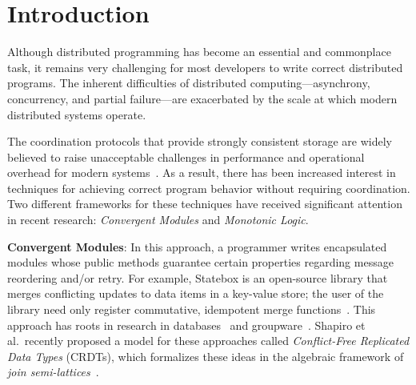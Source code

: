 \section{Introduction} 
\label{sec:intro} 
Although distributed programming has become an essential and commonplace task,
it remains very challenging for most developers to write correct distributed
programs. The inherent difficulties of distributed computing---asynchrony,
concurrency, and partial failure---are exacerbated by the scale at which modern
distributed systems operate.


The coordination protocols that provide strongly consistent storage are widely
believed to raise unacceptable challenges in performance and operational
overhead for modern systems~\cite{Birman2009}. As a result, there has been
increased interest in techniques for achieving correct program behavior without
requiring coordination.  Two different frameworks for these techniques have
received significant attention in recent research: \emph{Convergent Modules} and
\emph{Monotonic Logic}.

\vspace{0.5em}\noindent
\textbf{Convergent Modules}: In this approach, a programmer writes encapsulated
modules whose public methods guarantee certain properties regarding message
reordering and/or retry. For example, Statebox is an open-source library that
merges conflicting updates to data items in a key-value store; the user of the
library need only register commutative, idempotent merge
functions~\cite{statebox}. This approach has roots in research in
databases~\cite{Farrag1989,Garcia-Molina1983,Helland2009} and
groupware~\cite{Ellis1989,Sun1998}.  Shapiro et al.\ recently proposed a model
for these approaches called \emph{Conflict-Free Replicated Data Types} (CRDTs),
which formalizes these ideas in the algebraic framework of {\em join
  semi-lattices}~\cite{Shapiro2011b}.

